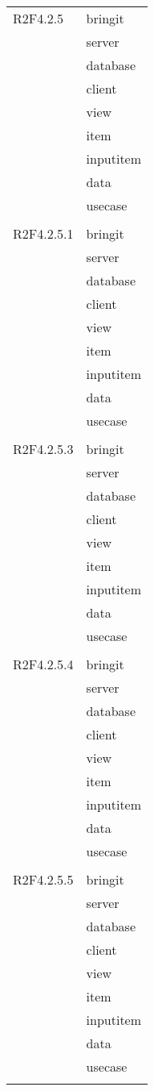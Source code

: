 \begin{center}
\begin{longtable}{|p{7cm}|p{7cm}|}
		R2F4.2.5 & bringit \\ & server \\ & database \\ & client \\ & view \\ & item \\ & inputitem \\ & data \\ & usecase \\ & \\ \hline
		R2F4.2.5.1 & bringit \\ & server \\ & database \\ & client \\ & view \\ & item \\ & inputitem \\ & data \\ & usecase \\ & \\ \hline
		R2F4.2.5.3 & bringit \\ & server \\ & database \\ & client \\ & view \\ & item \\ & inputitem \\ & data \\ & usecase \\ & \\ \hline
		R2F4.2.5.4 & bringit \\ & server \\ & database \\ & client \\ & view \\ & item \\ & inputitem \\ & data \\ & usecase \\ & \\ \hline
		R2F4.2.5.5 & bringit \\ & server \\ & database \\ & client \\ & view \\ & item \\ & inputitem \\ & data \\ & usecase \\ & \\ \hline

\end{longtable}
\end{center}
